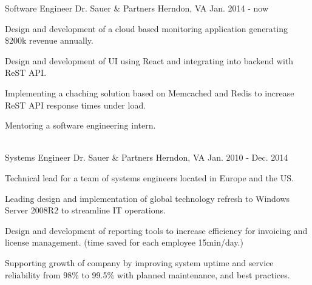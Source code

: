 \begin{cventries}
  \cventry
    {Software Engineer}
    {Dr. Sauer \& Partners}
    {Herndon, VA}
    {Jan. 2014 - now}
    {
      \begin{cvitems}
        \item {Design and development of a cloud based monitoring application generating \$200k revenue annually.}
		\item {Design and development of UI using React and integrating into backend with ReST API.}
		\item {Implementing a chaching solution based on Memcached and Redis to increase ReST API response times under load.}
		\item {Mentoring a software engineering intern.}
      \end{cvitems}
    }    
    \\
  \cventry
    {Systems Engineer}
    {Dr. Sauer \& Partners}
    {Herndon, VA}
    {Jan. 2010 - Dec. 2014}
    {
      \begin{cvitems}
        \item {Technical lead for a team of systems engineers located in Europe and the US.}
        \item {Leading design and implementation of global technology refresh to Windows Server 2008R2 to streamline IT operations.}
        \item {Design and development of reporting tools to increase efficiency for invoicing and license management. (time saved for each employee 15min/day.)}
        \item {Supporting growth of company by improving system uptime and service reliability from 98\% to 99.5\% with planned maintenance, and best practices.}        
      \end{cvitems}
    }
\end{cventries}
